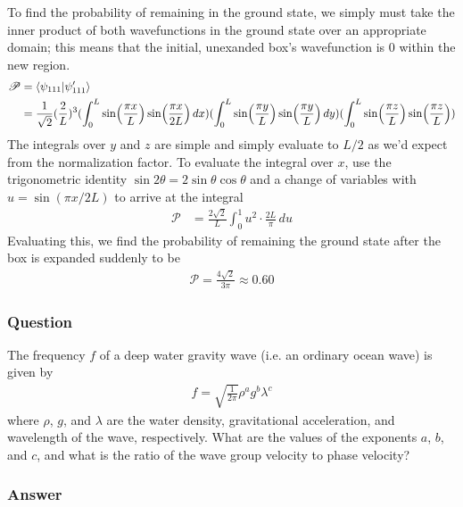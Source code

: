 To find the probability of remaining in the ground state, we simply must
take the inner product of both wavefunctions in the ground state over an
appropriate domain; this means that the initial, unexanded box's wavefunction
is 0 within the new region.
\begin{align*}
    \mathscr{P} &= \braket{\psi _{111}}{\psi '_{111}} \\
    {} &= \frac{1}{\sqrt{2}} (\frac{2}{L})^3  (\int_0^L \sin(\frac{{\pi} x}{L})
	\sin(\frac{{\pi} x}{2L}) \,dx) (\int_0^L \sin(\frac{{\pi} y}{L})
	\sin(\frac{{\pi} y}{L}) \,dy) (\int_0^L \sin(\frac{{\pi} z}{L})
	\sin(\frac{{\pi} z}{L}))
\end{align*}
The integrals over $y$ and $z$ are simple and simply evaluate to $L/2$ as
we'd expect from the normalization factor. To evaluate the integral over $x$,
use the trigonometric identity $\sin 2\theta  = 2\sin \theta  \cos \theta $ and a change of
variables with $u = \sin({\pi} x/2L)$ to arrive at the integral
\begin{align*}
    \mathscr{P} &= \frac{2\sqrt 2}{L} \int_0^1 u^2 \cdot  \frac{2L}{{\pi} }\,du
\end{align*}
Evaluating this, we find the probability of remaining the ground state after
the box is expanded suddenly to be
\begin{align}
    \boxed{\mathscr{P} = \frac{4\sqrt 2}{3{\pi} } \approx 0.60}
\end{align}

\subsubsection{Question}

The frequency $f$ of a deep water gravity wave (i.e. an ordinary ocean wave)
is given by
\begin{align*}
    f =\sqrt{\frac{1}{2{\pi} }} \rho ^a g^b {\lambda}^c
\end{align*}
where $\rho $, $g$, and ${\lambda}$ are the water density, gravitational acceleration, and
wavelength of the wave, respectively. What are the values of the exponents
$a$, $b$, and $c$, and what is the ratio of the wave group velocity to phase
velocity?

\subsubsection{Answer}

